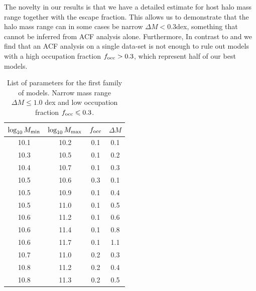 \documentclass[usenatbib]{mn2e}
\begin{document}
{The novelty in our results is that we have a detailed estimate for 
host halo mass range together with the escape fraction. This allows us
to demonstrate that the halo mass range can in some cases be narrow $\Delta M <
0.3$dex, something that cannot be inferred from ACF analysis alone.
Furthermore, In contrast to \citep{Gawiser07} and \citep{Ouchi2010} we
find that an ACF analysis on a single data-set is not enough to rule
out models with a high occupation fraction $f_{\rm occ}>0.3$, which
represent half of our best models. 

\begin{table}
\begin{center}
\begin{tabular}{cccc}\hline\hline
$\log_{10}M_{\rm min}$ & $\log_{10}M_{\rm max}$ & $f_{\rm occ}$ & $\Delta M$\\\hline
10.1 &10.2 & 0.1 & 0.1\\
10.3 &10.5 & 0.1 & 0.2\\
10.4 &10.7 & 0.1 & 0.3\\
10.5 &10.6 & 0.3 & 0.1\\
10.5 &10.9 & 0.1 & 0.4\\
10.5 &11.0 & 0.1 & 0.5\\
10.6 &11.2 & 0.1 & 0.6\\
10.6 &11.4 & 0.1 & 0.8\\
10.6 &11.7 & 0.1 & 1.1\\
10.7 &11.0 & 0.2 & 0.3\\
10.8 &11.2 & 0.2 & 0.4\\
10.8 &11.3 & 0.2 & 0.5\\\hline
\end{tabular}
\end{center}
\caption{\label{table:firstfamily}List of parameters for the first
  family of models. Narrow mass range $\Delta M\leq 1.0$ dex and low
  occupation fraction $f_{\rm occ}\leq 0.3$.} 
\end{table}



}
\end{document}
